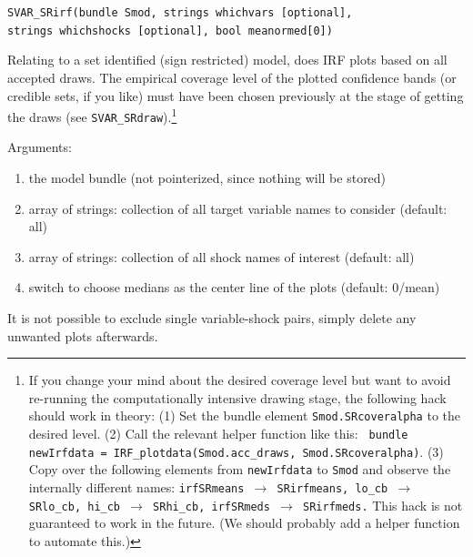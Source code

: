 \documentclass[a4paper,10pt]{article}
\newenvironment{funcdoc}[1]
{\noindent\hrulefill\newline\nopagebreak\texttt{#1}%
\nopagebreak\par\noindent\hrulefill%
\nopagebreak\par\nopagebreak\smallskip\nopagebreak\par}
{\bigskip}
\begin{document}
\begin{funcdoc}{SVAR\_SRirf(bundle Smod, strings whichvars [optional], \\
      strings whichshocks [optional], bool meanormed[0])}
Relating to a set identified (sign restricted) model, does IRF plots based on all
accepted draws. The empirical coverage level of the plotted confidence bands (or credible sets,
if you like) must have been chosen previously at the stage of getting the draws (see 
\texttt{SVAR\_SRdraw}).\footnote{%
If you change your mind about the desired coverage level 
but want to avoid re-running the computationally intensive drawing stage, the following hack 
should work in theory: (1) Set the bundle element \texttt{Smod.SRcoveralpha} to the desired level.
(2) Call the relevant helper function like this: 
\texttt{ bundle newIrfdata = IRF\_plotdata(Smod.acc\_draws, Smod.SRcoveralpha)}. 
(3) Copy over the following 
elements from \texttt{newIrfdata} to \texttt{Smod} and observe the internally different names:
\texttt{irfSRmeans $\rightarrow$ SRirfmeans, lo\_cb $\rightarrow$ SRlo\_cb,
hi\_cb $\rightarrow$ SRhi\_cb, irfSRmeds $\rightarrow$ SRirfmeds.}
This hack is not
guaranteed to work in the future. (We should probably add a helper function to automate this.) }

Arguments:
 \begin{enumerate}
  \item the model bundle (not pointerized, since nothing will be stored)
  \item array of strings: collection of all target variable names to consider (default: all)
  \item array of strings: collection of all shock names of interest (default: all)
  \item switch to choose medians as the center line of the plots (default: 0/mean)
 \end{enumerate}
 It is not possible to exclude single variable-shock pairs, simply delete any unwanted plots afterwards. 
\end{funcdoc}
\end{document}
